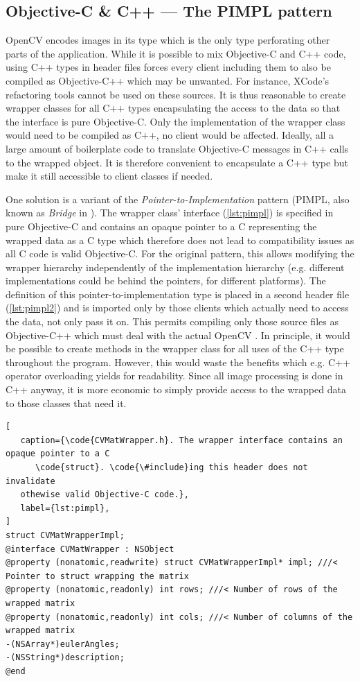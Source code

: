 \subsection{Objective-C \& C++ --- The PIMPL pattern}

 OpenCV encodes images in its  type which is
the only type perforating other parts of the application.  While it is possible
to mix Objective-C and C++ code, using C++ types in header files forces every
client including them to also be compiled as Objective-C++ which may be
unwanted. For instance, XCode's refactoring tools cannot be used on these
sources. It is thus reasonable to create wrapper classes for all C++ types
encapsulating the access to the data so that the interface is pure Objective-C.
Only the implementation of the wrapper class would need to be compiled as C++,
no client would be affected. Ideally, all a large amount of boilerplate code to
translate Objective-C messages in C++ calls to the wrapped object.  It is
therefore convenient to encapsulate a C++ type but make it still accessible to
client classes if needed. 

One solution is a variant of the \emph{Pointer-to-Implementation} pattern
(PIMPL, also known as \emph{Bridge} in \citep{gamma1995}). The wrapper class'
interface (\autoref{lst:pimpl}) is specified in pure Objective-C and contains an
opaque pointer to a C  representing the wrapped data as a C type
which therefore does not lead to compatibility issues as all C code is valid
Objective-C. For the original pattern, this allows modifying the wrapper
hierarchy independently of the implementation hierarchy (e.g. different
implementations could be behind the pointers, for different platforms). The
definition of this pointer-to-implementation type is placed in a second header
file (\autoref{lst:pimpl2}) and is imported only by those clients which actually
need to access the data, not only pass it on. This permits compiling only those
source files as Objective-C++ which must deal with the actual OpenCV .
In principle, it would be possible to create methods in the wrapper class for
all uses of the C++ type throughout the program. However, this would waste the
benefits which e.g. C++ operator overloading yields for readability. Since all
image processing is done in C++ anyway, it is more economic to simply provide
access to the wrapped data to those classes that need it.

\lstset{
   language=[Objective]C,
   float,
}

\begin{lstlisting}[
   caption={\code{CVMatWrapper.h}. The wrapper interface contains an opaque pointer to a C
      \code{struct}. \code{\#include}ing this header does not invalidate
   othewise valid Objective-C code.},
   label={lst:pimpl},
]
struct CVMatWrapperImpl;
@interface CVMatWrapper : NSObject
@property (nonatomic,readwrite) struct CVMatWrapperImpl* impl; ///< Pointer to struct wrapping the matrix
@property (nonatomic,readonly) int rows; ///< Number of rows of the wrapped matrix
@property (nonatomic,readonly) int cols; ///< Number of columns of the wrapped matrix
-(NSArray*)eulerAngles;
-(NSString*)description;
@end
\end{lstlisting}

